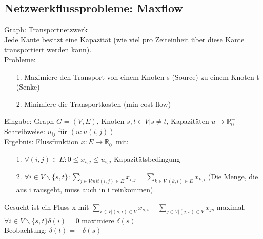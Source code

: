 \documentclass[a4paper]{article}
\begin{document}
\subsection*{Netzwerkflussprobleme: Maxflow }
Graph: Transportnetzwerk \\
Jede Kante besitzt eine Kapazität (wie viel pro Zeiteinheit über diese Kante transportiert werden kann).\\
\underline{Probleme:}
\begin{itemize}
\item[1. ]Maximiere den Transport von einem Knoten s (Source) zu einem Knoten t (Senke)
\item[2. ]Minimiere die Transportkosten (min cost flow)
\end{itemize} 
Eingabe: Graph $G=(V,E)$, Knoten $s, t \in V | s\neq t$, Kapazitäten $u\rightarrow \mathbb{R}^+_0$\\
Schreibweise: $u_{ij}$ für $(u: u(i,j))$\\
Ergebnis: Flussfunktion $x: E \rightarrow \mathbb{R}^+_0$ mit:
\begin{itemize}
\item[1. ]$\forall (i,j) \in E: 0\leq x_{i,j} \leq u_{i,j}$ Kapazitätsbedingung
\item[2. ]$\forall i\in V \backslash \{s,t\}: \sum_{j\in V mit (i,j)\in E} x_{i,j} = \sum_{k\in V | (k,i)\in E} x_{k,i}$ (Die Menge, die aus i rausgeht, muss auch in i reinkommen).
\end{itemize}
Gesucht ist ein Fluss x mit $\sum_{i\in V | (s,i)\in V} x_{s,i} - \sum_{j\in V | (j,s)\in V} x_{js}$ maximal.\\
$\forall i\in V \backslash \{s,t\}  \delta (i)=0$ maximiere $\delta (s)$\\
Beobachtung: $\delta (t) =-\delta (s)$\\
\end{document}
